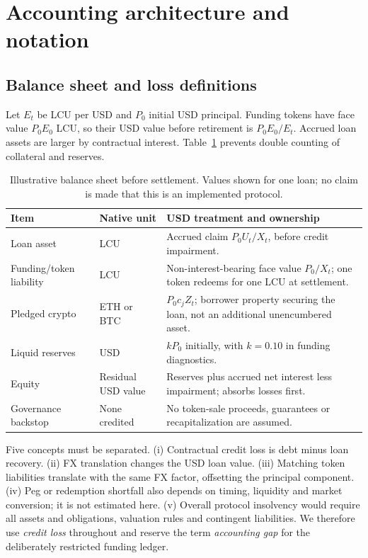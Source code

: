 \documentclass[11pt,a4paper]{article}
\begin{document}
\section{Accounting architecture and notation}
\subsection{Balance sheet and loss definitions}
Let $E_t$ be LCU per USD and $P_0$ initial USD principal. Funding tokens have face value $P_0E_0$ LCU, so their USD value before retirement is $P_0E_0/E_t$. Accrued loan assets are larger by contractual interest. Table~\ref{tab:balance} prevents double counting of collateral and reserves.
\begin{table}[H]\centering\small
\caption{Illustrative balance sheet before settlement. Values shown for one loan; no claim is made that this is an implemented protocol.}\label{tab:balance}
\begin{tabularx}{\linewidth}{p{28mm}p{26mm}X}\toprule
Item & Native unit & USD treatment and ownership\\\midrule
Loan asset & LCU & Accrued claim $P_0U_t/X_t$, before credit impairment.\\
Funding/token liability & LCU & Non-interest-bearing face value $P_0/X_t$; one token redeems for one LCU at settlement.\\
Pledged crypto & ETH or BTC & $P_0c_jZ_t$; borrower property securing the loan, not an additional unencumbered asset.\\
Liquid reserves & USD & $kP_0$ initially, with $k=0.10$ in funding diagnostics.\\
Equity & Residual USD value & Reserves plus accrued net interest less impairment; absorbs losses first.\\
Governance backstop & None credited & No token-sale proceeds, guarantees or recapitalization are assumed.\\\bottomrule
\end{tabularx}\end{table}

Five concepts must be separated. (i) Contractual credit loss is debt minus loan recovery. (ii) FX translation changes the USD loan value. (iii) Matching token liabilities translate with the same FX factor, offsetting the principal component. (iv) Peg or redemption shortfall also depends on timing, liquidity and market conversion; it is not estimated here. (v) Overall protocol insolvency would require all assets and obligations, valuation rules and contingent liabilities. We therefore use \emph{credit loss} throughout and reserve the term \emph{accounting gap} for the deliberately restricted funding ledger.
\end{document}
